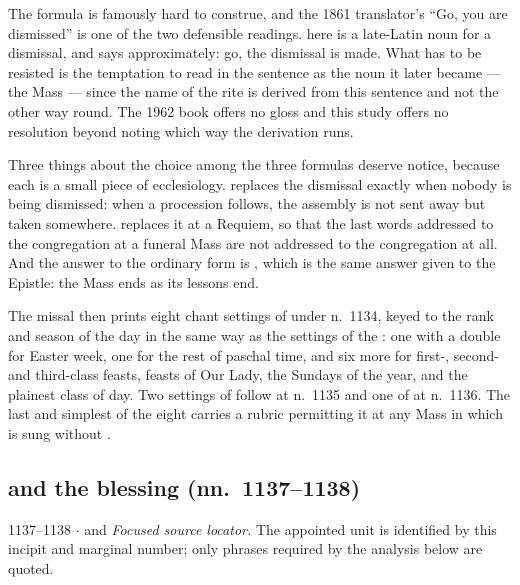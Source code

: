 The formula is famously hard to construe, and the 1861 translator's ``Go, you
are dismissed'' is one of the two defensible readings.  here is
a late-Latin noun for a dismissal, and  says
approximately: go, the dismissal is made. What has to be resisted is the
temptation to read  in the sentence as the noun it later became
--- the Mass --- since the name of the rite is derived from this sentence and
not the other way round. The 1962 book offers no gloss and this study offers no
resolution beyond noting which way the derivation runs.

Three things about the choice among the three formulas deserve notice, because
each is a small piece of ecclesiology.  replaces
the dismissal exactly when nobody is being dismissed: when a procession
follows, the assembly is not sent away but taken somewhere.  replaces it at a Requiem, so that the last words addressed to the
congregation at a funeral Mass are not addressed to the congregation at all. And
the answer to the ordinary form is , which is the same
answer given to the Epistle: the Mass ends as its lessons end.

The missal then prints eight chant settings of  under
n.~1134, keyed to the rank and season of the day in the same way as the
settings of the : one with a double  for
Easter week, one for the rest of paschal time, and six more for first-, second-
and third-class feasts, feasts of Our Lady, the Sundays of the year, and the
plainest class of day. Two settings of  follow at
n.~1135 and one of  at n.~1136. The last and
simplest of the eight carries a rubric permitting it  at
any Mass in which  is sung without
.

\subsection*{ and the blessing (nn.~1137--1138)}

\begin{appointed}{1137--1138 $\cdot$  and }
\textit{Focused source locator.} The appointed unit is identified by this incipit and marginal number; only phrases required by the analysis below are quoted.
\end{appointed}


